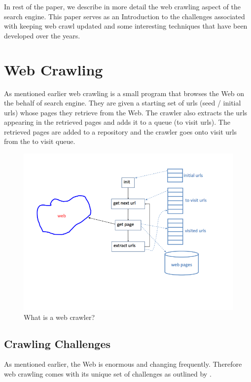 \documentclass[a4paper, 11pt]{article} %
\begin{document}
In rest of the paper, we describe in more detail the web crawling aspect of the search engine. This paper serves as an Introduction to the challenges associated with keeping web crawl updated and some interesting techniques that have been developed over the years. \\


\section{Web Crawling}

As mentioned earlier web crawling is a small program that browses the Web on the behalf of search engine. They are given a starting set of urls (seed / initial urls) whose pages they retrieve from the Web. The crawler also extracts the urls appearing in the retrieved pages and adds it to a queue (to visit urls). The retrieved pages are added to a repository and the crawler goes onto visit urls from the to visit queue. \cite{baeza1999modern} 

\begin{figure}[h] %
\begin{center}
\includegraphics[width=1\textwidth]{webcrawling.png}
\end{center}
\caption{What is a web crawler?}
\end{figure}

\subsection{Crawling Challenges}

As mentioned earlier, the Web is enormous and changing frequently. Therefore web crawling comes with its unique set of challenges as outlined by \cite{arasu2001searching}.
\end{document}
